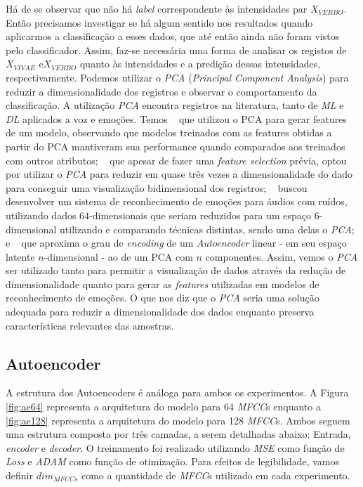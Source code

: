 Há de se observar que não há \textit{label} correspondente às intensidades par $X_{VERBO}$. Então precisamos investigar se há algum sentido nos resultados quando aplicarmos a classificação a esses dados, que até então ainda não foram vistos pelo classificador. Assim, faz-se necessária uma forma de analisar os registos de $X_{VIVAE}$ e$X_{VERBO}$ quanto às intensidades e a predição dessas intensidades, respectivamente. Podemos utilizar o \textit{PCA} (\textit{Principal Component Analysis}) para reduzir a dimensionalidade dos registros e observar o comportamento da classificação. A utilização \textit{PCA} encontra registros na literatura, tanto de \textit{ML} e \textit{DL} aplicados a voz e emoções. Temos ~\cite{pca1} que utilizou o PCA para gerar features de um modelo, observando que modelos treinados com as features obtidas a partir do PCA mantiveram sua performance quando comparados aos treinados com outros atributos; ~\cite{pca2} que apesar de fazer uma \textit{feature selection} prévia, optou por utilizar o \textit{PCA} para reduzir em quase três vezes a dimensionalidade do dado para conseguir uma visualização bidimensional dos registros; ~\cite{pca3} buscou desenvolver um sistema de reconhecimento de emoções para áudios com ruídos, utilizando dados $64$-dimensionais que seriam reduzidos para um espaço $6$-dimensional utilizando e comparando técnicas distintas, sendo uma delas o \textit{PCA}; e ~\cite{pca5} que aproxima o grau de \textit{encoding} de um \textit{Autoencoder} linear - em seu espaço latente $n$-dimensional - ao de um PCA com $n$ componentes. Assim, vemos o \textit{PCA} ser utilizado tanto para permitir a visualização de dados através da redução de dimensionalidade quanto para gerar as \textit{features} utilizadas em modelos de reconhecimento de emoções. O que nos diz que o \textit{PCA} seria uma solução adequada para reduzir a dimensionalidade dos dados enquanto preserva características relevantes das amostras.

\subsection{Autoencoder}

A estrutura dos Autoencoders é análoga para ambos os experimentos. A Figura \ref{fig:ae64} representa a arquitetura do modelo para 64 \textit{MFCC}s enquanto a \ref{fig:ae128} representa a arquitetura do modelo para 128 \textit{MFCC}s. Ambos seguem uma estrutura composta por três camadas, a serem detalhadas abaixo: Entrada, \textit{encoder} e \textit{decoder}. O treinamento foi realizado utilizando \textit{MSE} como função de \textit{Loss} e \textit{ADAM} como função de otimização. Para efeitos de legibilidade, vamos definir $dim_{MFCCs}$ como a quantidade de \textit{MFCC}s utilizado em cada experimento.

